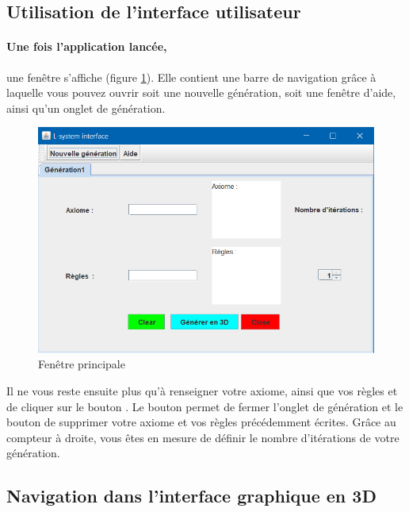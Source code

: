 \subsection{Utilisation de l'interface utilisateur}

\paragraph{Une fois l'application lancée,} une fenêtre s'affiche (figure \ref{mainframe}). Elle contient une barre de navigation grâce à laquelle vous pouvez ouvrir soit une nouvelle génération, soit une fenêtre d'aide, ainsi qu'un onglet de génération.
\begin{figure}[h!]
    \centering
    \includegraphics[scale=0.5]{pics/MainFrameGUI.PNG}
    \caption{Fenêtre principale}
    \label{mainframe}
\end{figure}
Il ne vous reste ensuite plus qu'à renseigner votre axiome, ainsi que vos règles et de cliquer sur le bouton . Le bouton  permet de fermer l'onglet de génération et le bouton  de supprimer votre axiome et vos règles précédemment écrites. Grâce au compteur à droite, vous êtes en mesure de définir le nombre d'itérations de votre génération.


\subsection{Navigation dans l'interface graphique en 3D}
\label{sec:nav_3d}

